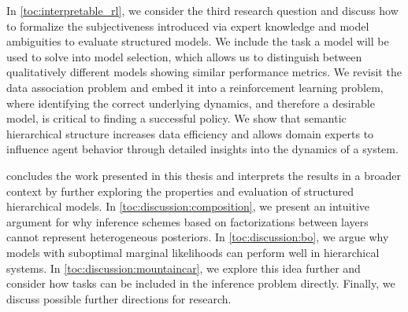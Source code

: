 In \cref{toc:interpretable_rl}, we consider the third research question and discuss how to formalize the subjectiveness introduced via expert knowledge and model ambiguities to evaluate structured models.
We include the task a model will be used to solve into model selection, which allows us to distinguish between qualitatively different models showing similar performance metrics.
We revisit the data association problem and embed it into a reinforcement learning problem, where identifying the correct underlying dynamics, and therefore a desirable model, is critical to finding a successful policy.
We show that semantic hierarchical structure increases data efficiency and allows domain experts to influence agent behavior through detailed insights into the dynamics of a system.

 concludes the work presented in this thesis and interprets the results in a broader context by further exploring the properties and evaluation of structured hierarchical models.
In \cref{toc:discussion:composition}, we present an intuitive argument for why inference schemes based on factorizations between layers cannot represent heterogeneous posteriors.
In \cref{toc:discussion:bo}, we argue why models with suboptimal marginal likelihoods can perform well in hierarchical systems.
In \cref{toc:discussion:mountaincar}, we explore this idea further and consider how tasks can be included in the inference problem directly.
Finally, we discuss possible further directions for research.

